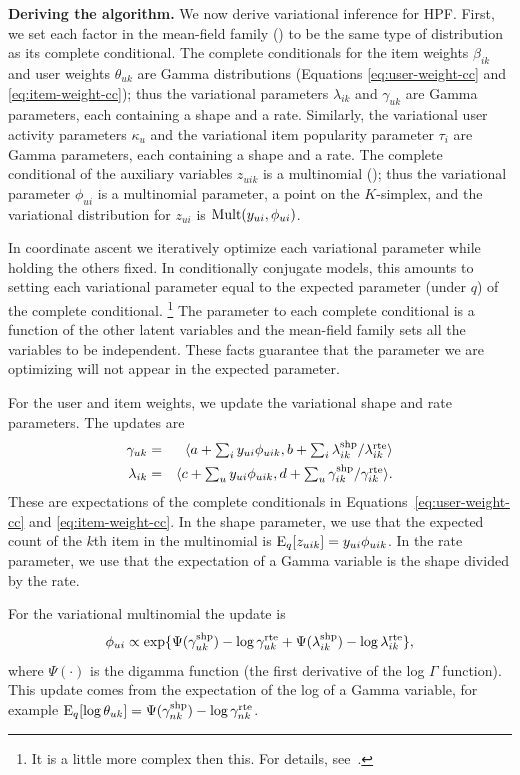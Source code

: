 {\bf Deriving the algorithm.}
We now derive variational inference for HPF. First, we set each
factor in the mean-field family () to be the same type of
distribution as its complete conditional.  The complete conditionals
for the item weights $\beta_{ik}$ and user weights $\theta_{uk}$ are
Gamma distributions (Equations \ref{eq:user-weight-cc} and
\ref{eq:item-weight-cc}); thus the variational parameters
$\lambda_{ik}$ and $\gamma_{uk}$ are Gamma parameters, each containing
a shape and a rate.  Similarly, the variational user activity
parameters $\kappa_u$ and the variational item popularity parameter
$\tau_i$ are Gamma parameters, each containing a shape and a rate.
The complete conditional of the auxiliary variables $z_{uik}$ is a
multinomial (); thus the variational parameter
$\phi_{ui}$ is a multinomial parameter, a point on the $K$-simplex,
and the variational distribution for $z_{ui}$ is $\textrm{Mult}(y_{ui},
\phi_{ui})$.

In coordinate ascent we iteratively optimize each variational
parameter while holding the others fixed.  In conditionally conjugate
models, this amounts to setting each variational parameter equal to
the expected parameter (under $q$) of the complete conditional.
\footnote{It is a little more complex then this. For details, see~\cite{Hoffman:2013}.}  
The parameter to each complete conditional is a function of the other
latent variables and the mean-field family sets all the variables to
be independent.  These facts guarantee that the parameter we are
optimizing will not appear in the expected parameter.

For the user and item weights, we update the variational shape and
rate parameters. The updates are
\begin{eqnarray}
  \gamma_{uk} &=& \langle a + \textstyle \sum_{i} y_{ui} \phi_{uik},
  b + \textstyle \sum_i \lambda_{ik}^{\textrm{shp}} / \lambda_{ik}^{\textrm{rte}} \rangle \\
  \lambda_{ik} &=& \langle c + \textstyle \sum_{u} y_{ui} \phi_{uik},
  d + \textstyle \sum_u \gamma_{ik}^{\textrm{shp}} / \gamma_{ik}^{\textrm{rte}} \rangle.
\end{eqnarray}
These are expectations of the complete conditionals in
Equations~\ref{eq:user-weight-cc} and \ref{eq:item-weight-cc}.  In the
shape parameter, we use that the expected count of the $k$th item in
the multinomial is $\textrm{E}_q[z_{uik}] = y_{ui} \phi_{uik}$. In the rate
parameter, we use that the expectation of a Gamma variable is the
shape divided by the rate.

For the variational multinomial the update is
\begin{equation}
  \phi_{ui} \propto \exp\{\Psi(\gamma_{uk}^{\textrm{shp}}) - \log
  \gamma_{uk}^{\textrm{rte}} + \Psi(\lambda_{ik}^{\textrm{shp}}) - \log
  \lambda_{ik}^{\textrm{rte}}\},
\end{equation}
where $\Psi(\cdot)$ is the digamma function (the first derivative of
the log $\Gamma$ function).  This update comes from the expectation of
the log of a Gamma variable, for example $\textrm{E}_q[\log \theta_{uk}] =
\Psi(\gamma_{nk}^{\textrm{shp}}) - \log \gamma_{nk}^{\textrm{rte}}$.

